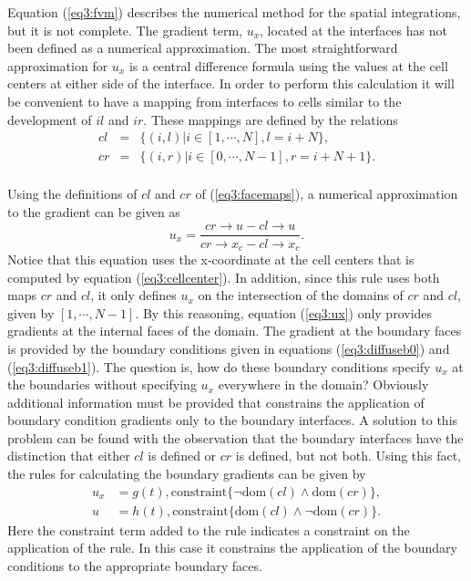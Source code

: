 \documentclass[10pt,epsf,letterpaper,twoside]{book}
\begin{document}
Equation (\ref{eq3:fvm}) describes the numerical method for
the spatial integrations, but it is not complete.  The gradient term,
$u_x$, located at the interfaces has not been defined as a numerical
approximation.  The most straightforward approximation for $u_x$ is a
central difference formula using the values at the cell centers at
either side of the interface.  In order to perform this calculation it
will be convenient to have a mapping from interfaces to cells similar to
the development of $il$ and $ir$.  These mappings are defined by
the relations
\begin{equation}
\begin{array}{rcl}
cl & = & \lbrace (i,l) | i \in [1, \cdots, N], l = i+N \rbrace,\\
cr & = & \lbrace (i,r) | i \in [0, \cdots, N-1], r = i+N+1 \rbrace.\\
\end{array}
\label{eq3:facemaps}
\end{equation}

Using the definitions of $cl$ and $cr$ of (\ref{eq3:facemaps}), a
numerical approximation to the gradient can be given as
\begin{equation}
  u_x = \frac{cr\rightarrow u - cl\rightarrow u}
{cr\rightarrow x_c - cl\rightarrow x_c}.
\label{eq3:ux}
\end{equation}
Notice that this equation uses the x-coordinate at the cell centers
that is computed by equation (\ref{eq3:cellcenter}).  In addition,
since this rule uses both maps $cr$ and $cl$, it only defines $u_x$ on
the intersection of the domains of $cr$ and $cl$, given by $[1, \cdots,
N-1]$.  By this reasoning, equation (\ref{eq3:ux}) only provides
gradients at the internal faces of the domain.  The gradient at the
boundary faces is provided by the boundary conditions given in
equations (\ref{eq3:diffuseb0}) and (\ref{eq3:diffuseb1}).  The
question is, how do these boundary conditions specify $u_x$ at the
boundaries without specifying $u_x$ everywhere in the domain?
Obviously additional information must be provided that constrains
the application of boundary condition gradients only to the boundary
interfaces.  A solution to this problem can be found with the
observation that the boundary interfaces have the distinction that
either $cl$ is defined or $cr$ is defined, but not both.  Using this
fact, the rules for calculating the boundary gradients can be given by
\begin{equation}
\begin{aligned}
u_x & = g(t), \mbox{constraint}\lbrace \neg \mathrm{dom}(cl) \wedge
\mathrm{dom}(cr) \rbrace, \label{eq3:brule0}\\
u & = h(t), \mbox{constraint}\lbrace \mathrm{dom}(cl)
\wedge \neg \mathrm{dom}(cr) \rbrace. %
\end{aligned}
\end{equation}
Here the constraint term added to the rule indicates a constraint on
the application of the rule.  In this case it constrains the
application of the boundary conditions to the appropriate boundary faces.
\end{document}
